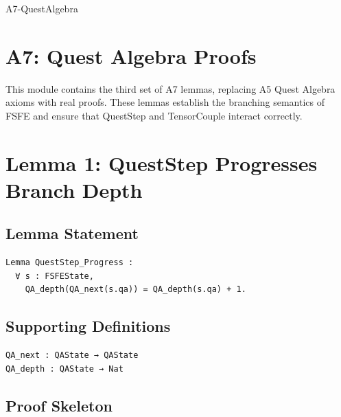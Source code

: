\documentclass[11pt]{article}
\begin{document}


\begin{citationmembrane}{A7-QuestAlgebra}
\end{citationmembrane}

\section*{A7: Quest Algebra Proofs}

This module contains the third set of A7 lemmas, replacing A5 Quest Algebra
axioms with real proofs. These lemmas establish the branching semantics of FSFE
and ensure that QuestStep and TensorCouple interact correctly.

\newpage


\section{Lemma 1: QuestStep Progresses Branch Depth}

\subsection{Lemma Statement}

\begin{verbatim}
Lemma QuestStep_Progress :
  ∀ s : FSFEState,
    QA_depth(QA_next(s.qa)) = QA_depth(s.qa) + 1.
\end{verbatim}

\subsection{Supporting Definitions}

\begin{verbatim}
QA_next : QAState → QAState
QA_depth : QAState → Nat
\end{verbatim}

\subsection{Proof Skeleton}
\end{document}
